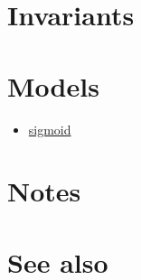 \documentclass{article}
\begin{document}
\section*{Invariants}

\section*{Models}

\begin{itemize}
\item \href{\kmlroot/sigmoid.html}{sigmoid}
\end{itemize}

\section*{Notes}


\section*{See also}




\end{document}
